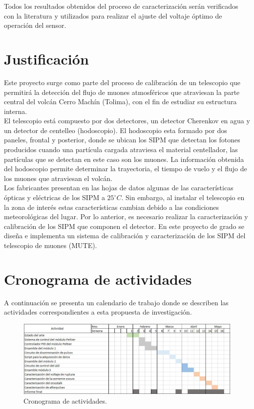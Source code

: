 \documentclass[11pt,letterpaper,oneside]{book}
\begin{document}
Todos los resultados obtenidos del proceso de caracterización serán verificados con la literatura y utilizados para realizar el ajuste del voltaje óptimo de operación del sensor. 




\newpage 
\chapter{Justificación}
Este proyecto surge como parte del proceso de calibración de un telescopio que permitirá la detección del flujo de muones atmosféricos que atraviesan la parte central del volcán Cerro Machín (Tolima), con el fin de estudiar su estructura interna.\\ 
El telescopio está compuesto por dos detectores, un detector Cherenkov en agua y un detector de centelleo (hodoscopio). El hodoscopio esta formado por dos paneles, frontal y posterior, donde se ubican los SIPM que detectan los fotones producidos cuando una partícula cargada atraviesa el material centellador, las partículas que se detectan en este caso son los muones. La información obtenida del hodoscopio permite determinar la trayectoria, el tiempo de vuelo y el flujo de los muones que atraviesan el volcán.\\

Los fabricantes presentan en las hojas de datos algunas de las características ópticas y eléctricas de los SIPM a $25 ^ \circ C$. Sin embargo, al instalar el telescopio en la zona de interés estas características cambian debido a las condiciones meteorológicas del lugar. Por lo anterior, es necesario realizar la  caracterización y calibración de los SIPM que componen el detector. En este proyecto de grado se diseña e implementa un sistema de calibración y caracterización de los SIPM del telescopio de muones (MUTE). 
 
\newpage 

\chapter{Cronograma de actividades}
A continuación se presenta un calendario de trabajo donde se describen las actividades correspondientes a esta propuesta de investigación.  

\begin{figure}[ht]
  \centering
  \includegraphics[width=\columnwidth]{Cronograma}
  \caption{Cronograma de actividades.}
\end{figure}
\end{document}
